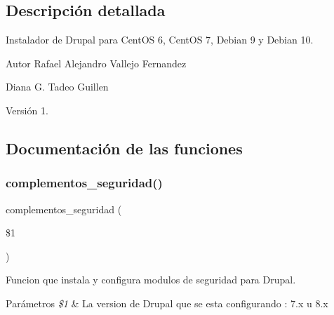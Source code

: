 \subsection{Descripción detallada}
Instalador de Drupal para Cent\+OS 6, Cent\+OS 7, Debian 9 y Debian 10. 

\begin{DoxyAuthor}{Autor}
Rafael Alejandro Vallejo Fernandez 

Diana G. Tadeo Guillen 
\end{DoxyAuthor}
\begin{DoxyVersion}{Versión}
1. 
\end{DoxyVersion}


\subsection{Documentación de las funciones}
\mbox{\label{Drupal__Instalador__General_8sh_a13df4a377004ee8af67f8e2495fe1afd}} 
\subsubsection{\texorpdfstring{complementos\+\_\+seguridad()}{complementos\_seguridad()}}
{\footnotesize\ttfamily complementos\+\_\+seguridad (\begin{DoxyParamCaption}\item[{}]{\$1 }\end{DoxyParamCaption})}



Funcion que instala y configura modulos de seguridad para Drupal. 


\begin{DoxyParams}{Parámetros}
{\em \$1} & La version de Drupal que se esta configurando \+: \textquotesingle{}7.\+x\textquotesingle{} u \textquotesingle{}8.\+x\textquotesingle{} \\
\hline
\end{DoxyParams}
\mbox{\label{Drupal__Instalador__General_8sh_a364d1278ff9a6b2b30118cf81b91734c}} 
